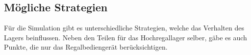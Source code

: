 \subsection{Mögliche Strategien}
Für die Simulation gibt es unterschiedliche Strategien, welche das Verhalten des Lagers beinflussen. Neben den Teilen für das Hochregallager selber, gäbe es auch Punkte, die nur das Regalbediengerät berücksichtigen.
%

